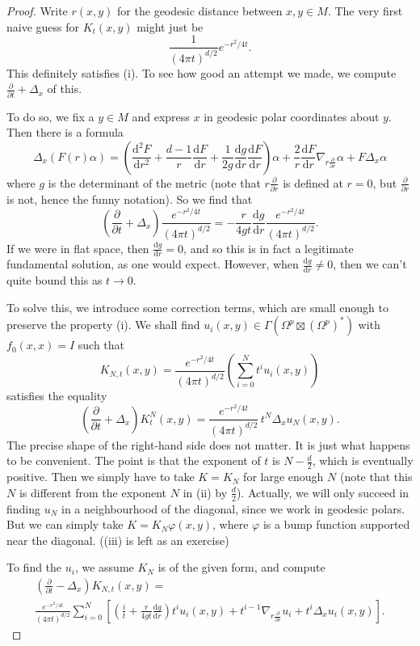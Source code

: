 \documentclass{shortart}
\theoremstyle{definition}
\renewcommand\d{\mathrm{d}}
\begin{document}
\begin{proof}
  Write $r(x, y)$ for the geodesic distance between $x, y \in M$. The very first naive guess for $K_t(x, y)$ might just be
  \[
    \frac{1}{(4\pi t)^{d/2}} e^{-r^2/4t}.
  \]
  This definitely satisfies (i). To see how good an attempt we made, we compute $\frac{\partial}{\partial t} + \Delta_x$ of this.

  To do so, we fix a $y \in M$ and express $x$ in geodesic polar coordinates about $y$. Then there is a formula
  \[
    \Delta_x (F(r) \alpha) = \left(\frac{\d^2 F}{\d r^2} + \frac{d - 1}{r} \frac{\d F}{\d r} + \frac{1}{2g} \frac{\d g}{\d r} \frac{\d F}{\d r}\right)\alpha + \frac{2}{r} \frac{\d F}{\d r} \nabla_{r \frac{\partial}{\partial r}} \alpha + F \Delta_x \alpha
  \]
  where $g$ is the determinant of the metric (note that $r\frac{\partial}{\partial r}$ is defined at $r = 0$, but $\frac{\partial}{\partial r}$ is not, hence the funny notation). So we find that
  \[
    \left(\frac{\partial}{\partial t} + \Delta_x\right) \frac{e^{-r^2/4t}}{(4\pi t)^{d/2}} = -\frac{r}{4g t} \frac{\d g}{\d r} \frac{e^{-r^2/4t}}{(4\pi t)^{d/2}}.
  \]
  If we were in flat space, then $\frac{\d g}{\d r} = 0$, and so this is in fact a legitimate fundamental solution, as one would expect. However, when $\frac{\d g}{\d r} \not= 0$, then we can't quite bound this as $t \to 0$.

  To solve this, we introduce some correction terms, which are small enough to preserve the property (i). We shall find $u_i(x, y) \in \Gamma(\Omega^p \boxtimes (\Omega^p)^*)$ with $f_0(x, x) = I$ such that
  \[
    K_{N, t} (x, y) = \frac{e^{-r^2/4t}}{(4\pi t)^{d/2}} \left(\sum_{i = 0}^N t^i u_i(x, y)\right)
  \]
  satisfies the equality
  \[
    \left(\frac{\partial}{\partial t} + \Delta_x\right) K^N_t(x, y) = \frac{e^{-r^2/4t}}{(4\pi t)^{d/2}}\, t^N \Delta_x u_N(x, y).
  \]
  The precise shape of the right-hand side does not matter. It is just what happens to be convenient. The point is that the exponent of $t$ is $N - \frac{d}{2}$, which is eventually positive. Then we simply have to take $K = K_N$ for large enough $N$ (note that this $N$ is different from the exponent $N$ in (ii) by $\frac{d}{2}$). Actually, we will only succeed in finding $u_N$ in a neighbourhood of the diagonal, since we work in geodesic polars. But we can simply take $K = K_N \varphi(x, y)$, where $\varphi$ is a bump function supported near the diagonal. ((iii) is left as an exercise)

  To find the $u_i$, we assume $K_N$ is of the given form, and compute
  \begin{multline*}
    \left(\frac{\partial}{\partial t} - \Delta_x\right) K_{N, t}(x, y) =\\
    \frac{e^{-r^2/4t}}{(4\pi t)^{d/2}} \sum_{i = 0}^N \left[\left( \frac{i}{t} + \frac{r}{4gt} \frac{\d g}{\d r}\right) t^i u_i(x, y) + t^{i - 1} \nabla_{r \frac{\partial}{\partial r}} u_i + t^i \Delta_x u_i(x, y)\right].
  \end{multline*}


\end{proof}
\end{document}
